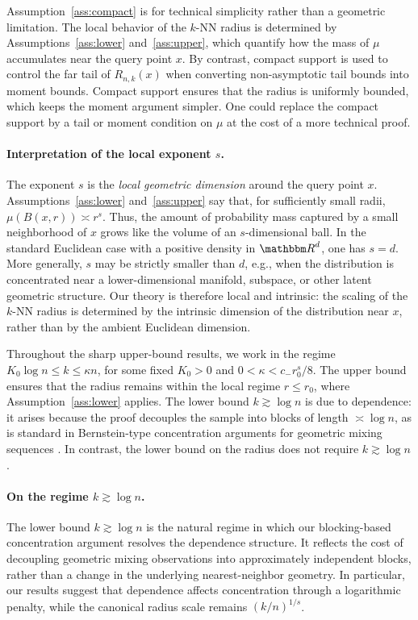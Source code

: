 \documentclass[12pt]{article}
\def\R{{\mathbbm R}}
\theoremstyle{definition}
\begin{document}
Assumption~\ref{ass:compact} is for technical simplicity rather than a geometric limitation. The local behavior of the $k$-NN radius is determined by Assumptions~\ref{ass:lower} and~\ref{ass:upper}, which quantify how the mass of $\mu$ accumulates near the query point $x$. By contrast, compact support is used to control the far tail of $R_{n,k}(x)$ when converting non-asymptotic tail bounds into moment bounds. Compact support ensures that the radius is uniformly bounded, which keeps the moment argument simpler. One could replace the compact support by a tail or moment condition on $\mu$ at the cost of a more technical proof.

\paragraph*{Interpretation of the local exponent $s$.}
The exponent $s$ is the \emph{local geometric dimension} around the query point $x$. Assumptions~\ref{ass:lower} and~\ref{ass:upper} say that, for sufficiently small radii, $\mu(B(x,r)) \asymp r^s$. Thus, the amount of probability mass captured by a small neighborhood of $x$ grows like the volume of an $s$-dimensional ball. In the standard Euclidean case with a positive density in $\R^d$, one has $s=d$. More generally, $s$ may be strictly smaller than $d$, e.g., when the distribution is concentrated near a lower-dimensional manifold, subspace, or other latent geometric structure. Our theory is therefore local and intrinsic: the scaling of the $k$-NN radius is determined by the intrinsic dimension of the distribution near $x$, rather than by the ambient Euclidean dimension. 

Throughout the sharp upper-bound results, we work in the regime $K_0 \log n \le k \le \kappa n$, for some fixed $K_0>0$ and $0 < \kappa < c_- r_0^s/8$. The upper bound ensures that the radius remains within the local regime $r\le r_0$, where Assumption~\ref{ass:lower} applies. The lower bound $k \gtrsim \log n$ is due to dependence: it arises because the proof decouples the sample into blocks of length $\asymp \log n$, as is standard in Bernstein-type concentration arguments for geometric mixing sequences \citep{liebscher1996strong,merlevede2009bernstein}. In contrast, the lower bound on the radius does not require $k \gtrsim \log n$. 

\paragraph*{On the regime $k \gtrsim \log n$.} The lower bound $k \gtrsim \log n$ is the natural regime in which our blocking-based concentration argument resolves the dependence structure. It reflects the cost of decoupling geometric mixing observations into approximately independent blocks, rather than a change in the underlying nearest-neighbor geometry. In particular, our results suggest that dependence affects concentration through a logarithmic penalty, while the canonical radius scale remains $(k/n)^{1/s}$.
\end{document}
